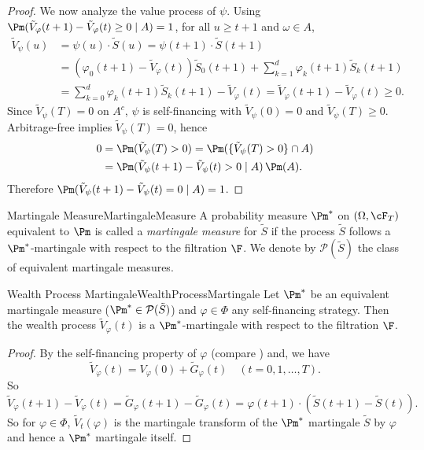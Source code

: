 \begin{proof}
	We now analyze the value process of $\psi$. Using $\Pm(\tilde{V}_{\varphi}(t+1)-\tilde{V}_{\varphi}(t)\ge 0\mid A)=1$, for all $u\ge t+1$ and $\omega\in A$,
	\[
		\begin{aligned}
			\tilde{V}_{\psi}(u) & =\psi(u)\cdot\tilde{S}(u)=\psi(t+1)\cdot\tilde{S}(t+1)                                                                    \\
			                    & =(\varphi_0(t+1)-\tilde{V}_{\varphi}(t))\tilde{S}_0(t+1)+\sum_{k=1}^d \varphi_k(t+1)\tilde{S}_k(t+1)                      \\
			                    & =\sum_{k=0}^d \varphi_k(t+1)\tilde{S}_k(t+1)-\tilde{V}_{\varphi}(t)=\tilde{V}_{\varphi}(t+1)-\tilde{V}_{\varphi}(t)\ge 0.
		\end{aligned}
	\]
	Since $\tilde{V}_{\psi}(T)=0$ on $A^c$, $\psi$ is self-financing with $\tilde{V}_{\psi}(0)=0$ and $\tilde{V}_{\psi}(T)\ge 0$. Arbitrage-free implies $\tilde{V}_{\psi}(T)=0$, hence
	\[
		\begin{aligned}
			0 & =\Pm(\tilde{V}_{\psi}(T)>0)=\Pm(\{\tilde{V}_{\psi}(T)>0\}\cap A) \\
			  & =\Pm(\tilde{V}_{\psi}(t+1)-\tilde{V}_{\psi}(t)>0\mid A)\,\Pm(A).
		\end{aligned}
	\]
	Therefore $\Pm(\tilde{V}_{\psi}(t+1)-\tilde{V}_{\psi}(t)=0\mid A)=1$.
\end{proof}

\begin{defn}{Martingale Measure}{MartingaleMeasure}
	A probability measure $\Pm^*$ on $(\Omega, \cF_T)$ equivalent to $\Pm$ is called a \textit{martingale measure} for $\tilde{S}$ if the process $\tilde{S}$ follows a $\Pm^*$-martingale with respect to the filtration $\F$. We denote by $\mathcal{P}(\tilde{S})$ the class of equivalent martingale measures.
\end{defn}

\begin{prop}{Wealth Process Martingale}{WealthProcessMartingale}
	Let $\Pm^*$ be an equivalent martingale measure ($\Pm^* \in \mathcal{P}(\tilde{S})$) and $\varphi \in \Phi$ any self-financing strategy. Then the wealth process $\tilde{V}_{\varphi}(t)$ is a $\Pm^*$-martingale with respect to the filtration $\F$.
\end{prop}

\begin{proof}
	By the self-financing property of $\varphi$ (compare ) and, we have
	\[
		\tilde{V}_{\varphi}(t) = V_{\varphi}(0) + \tilde{G}_{\varphi}(t) \quad (t = 0, 1, \dots, T).
	\]
	So
	\[
		\tilde{V}_{\varphi}(t+1) - \tilde{V}_{\varphi}(t) = \tilde{G}_{\varphi}(t+1) - \tilde{G}_{\varphi}(t) = \varphi(t+1) \cdot (\tilde{S}(t+1) - \tilde{S}(t)).
	\]
	So for $\varphi \in \Phi$, $\tilde{V}_t(\varphi)$ is the martingale transform of the $\Pm^*$ martingale $\tilde{S}$ by $\varphi$ and hence a $\Pm^*$ martingale itself.
\end{proof}

